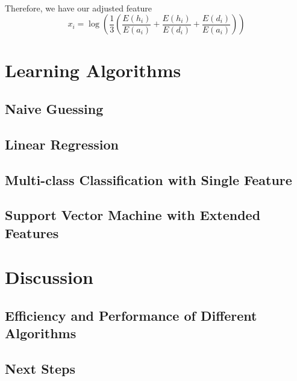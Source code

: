 \documentclass[12pt]{article}
\begin{document}
\paragraph{}
Therefore, we have our adjusted feature \[
x_i = \log(\frac{1}{3}(\frac{E(h_i)}{E(a_i)} + \frac{E(h_i)}{E(d_i)} + \frac{E(d_i)}{E(a_i)}))
\]
\section{Learning Algorithms}
\subsection{Naive Guessing}

\subsection{Linear Regression}
\subsection{Multi-class Classification with Single Feature}
\subsection{Support Vector Machine with Extended Features}

\section{Discussion}
\subsection{Efficiency and Performance of Different Algorithms}
\subsection{Next Steps}
\end{document}
